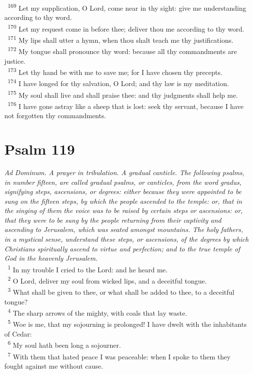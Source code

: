 \documentclass[a5paper,12pt]{article}
\begin{document}
\begin{multicols*}{2}
~\textsuperscript{169} Let my supplication, O Lord, come near in thy sight: give me understanding according to thy word.\\
~\textsuperscript{170} Let my request come in before thee; deliver thou me according to thy word.\\
~\textsuperscript{171} My lips shall utter a hymn, when thou shalt teach me thy justifications.\\
~\textsuperscript{172} My tongue shall pronounce thy word: because all thy commandments are justice.\\
~\textsuperscript{173} Let thy hand be with me to save me; for I have chosen thy precepts.\\
~\textsuperscript{174} I have longed for thy salvation, O Lord; and thy law is my meditation.\\
~\textsuperscript{175} My soul shall live and shall praise thee: and thy judgments shall help me.\\
~\textsuperscript{176} I have gone astray like a sheep that is lost: seek thy servant, because I have not forgotten thy commandments.\\

\section{Psalm 119}
\label{sec:org3c20986}
\emph{Ad Dominum. A prayer in tribulation. A gradual canticle. The following psalms, in number fifteen, are called gradual psalms, or canticles, from the word gradus, signifying steps, ascensions, or degrees: either because they were appointed to be sung on the fifteen steps, by which the people ascended to the temple: or, that in the singing of them the voice was to be raised by certain steps or ascensions: or, that they were to be sung by the people returning from their captivity and ascending to Jerusalem, which was seated amongst mountains. The holy fathers, in a mystical sense, understand these steps, or ascensions, of the degrees by which Christians spiritually ascend to virtue and perfection; and to the true temple of God in the heavenly Jerusalem.}\\

~\textsuperscript{1} In my trouble I cried to the Lord: and he heard me.\\
~\textsuperscript{2} O Lord, deliver my soul from wicked lips, and a deceitful tongue.\\
~\textsuperscript{3} What shall be given to thee, or what shall be added to thee, to a deceitful tongue?\\
~\textsuperscript{4} The sharp arrows of the mighty, with coals that lay waste.\\
~\textsuperscript{5} Woe is me, that my sojourning is prolonged! I have dwelt with the inhabitants of Cedar:\\
~\textsuperscript{6} My soul hath been long a sojourner.\\
~\textsuperscript{7} With them that hated peace I was peaceable: when I spoke to them they fought against me without cause.\\


\end{multicols*}
\end{document}
